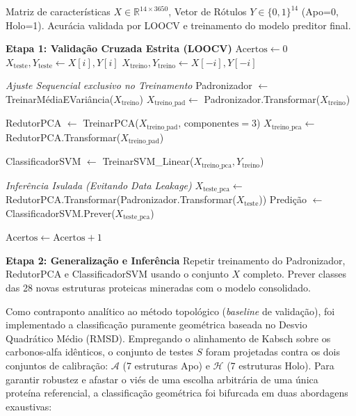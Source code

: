 \documentclass[12pt, a4paper]{article}
\theoremstyle{plain}
\theoremstyle{definition}
\theoremstyle{remark}
\newcommand{\ident}{\hspace{2em}}
\begin{document}
\begin{algorithm}[H]
\caption{Classificação Topológica Supervisionada com Proteção contra Vazamento de Dados}
\label{alg:svm_topologico}
\begin{algorithmic}[1]
\Require Matriz de características $X \in \mathbb{R}^{14 \times 3650}$, Vetor de Rótulos $Y \in \{0,1\}^{14}$ (Apo=0, Holo=1).
\Ensure Acurácia validada por LOOCV e treinamento do modelo preditor final.

\Statex \textbf{Etapa 1: Validação Cruzada Estrita (LOOCV)}
\State $\text{Acertos} \leftarrow 0$
    \State $X_{\text{teste}}, Y_{\text{teste}} \leftarrow X[i], Y[i]$
    \State $X_{\text{treino}}, Y_{\text{treino}} \leftarrow X[-i], Y[-i]$ 
    
    \Statex \indent \textit{Ajuste Sequencial exclusivo no Treinamento}
    \State Padronizador $\leftarrow$ TreinarMédiaEVariância($X_{\text{treino}}$)
    \State $X_{\text{treino\_pad}} \leftarrow$ Padronizador.Transformar($X_{\text{treino}}$)
    
    \State RedutorPCA $\leftarrow$ TreinarPCA($X_{\text{treino\_pad}}$, $\text{componentes}=3$)
    \State $X_{\text{treino\_pca}} \leftarrow$ RedutorPCA.Transformar($X_{\text{treino\_pad}}$)
    
    \State ClassificadorSVM $\leftarrow$ TreinarSVM\_Linear($X_{\text{treino\_pca}}, Y_{\text{treino}}$)
    
    \Statex \indent \textit{Inferência Isulada (Evitando Data Leakage)}
    \State $X_{\text{teste\_pca}} \leftarrow$ RedutorPCA.Transformar(Padronizador.Transformar($X_{\text{teste}}$))
    \State Predição $\leftarrow$ ClassificadorSVM.Prever($X_{\text{teste\_pca}}$)
    
        \State $\text{Acertos} \leftarrow \text{Acertos} + 1$
    \EndIf
\EndFor

\Statex \textbf{Etapa 2: Generalização e Inferência}
\State Repetir treinamento do Padronizador, RedutorPCA e ClassificadorSVM usando o conjunto $X$ completo.
\State Prever classes das 28 novas estruturas proteicas mineradas com o modelo consolidado.
\end{algorithmic}
\end{algorithm}

\ident Como contraponto analítico ao método topológico (\textit{baseline} de validação), foi implementado a classificação puramente geométrica baseada no Desvio Quadrático Médio (RMSD). Empregando o alinhamento de Kabsch sobre os carbonos-alfa idênticos, o conjunto de testes $S$ foram projetadas contra os dois conjuntos de calibração: $\mathcal{A}$ (7 estruturas Apo) e $\mathcal{H}$ (7 estruturas Holo). Para garantir robustez e afastar o viés de uma escolha arbitrária de uma única proteína referencial, a classificação geométrica foi bifurcada em duas abordagens exaustivas:
\end{document}
